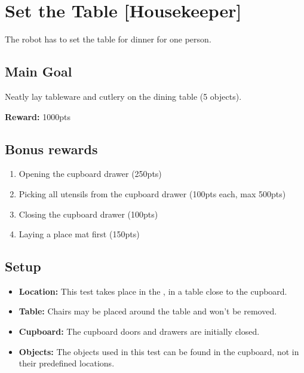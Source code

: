 \section{Set the Table [Housekeeper]}
\label{test:set-the-table}
The robot has to set the table for dinner for one person.


\subsection*{Main Goal}
Neatly lay tableware and cutlery on the dining table (5 objects).

\noindent\textbf{Reward:} 1000pts

\subsection*{Bonus rewards}
\begin{enumerate}[nosep]
	\item Opening the cupboard drawer (250pts)
	\item Picking all utensils from the cupboard drawer (100pts each, max 500pts)
	\item Closing the cupboard drawer (100pts)
	\item Laying a place mat first (150pts)
\end{enumerate}

\subsection*{Setup}
\begin{itemize}[nosep]
	\item \textbf{Location:} This test takes place in the \Arena{}, in a table close to the cupboard.
	\item \textbf{Table:} Chairs may be placed around the table and won't be removed.
	\item \textbf{Cupboard:} The cupboard doors and drawers are initially closed.
	\item \textbf{Objects:} The objects used in this test can be found in the cupboard, not in their predefined locations.
\end{itemize}


